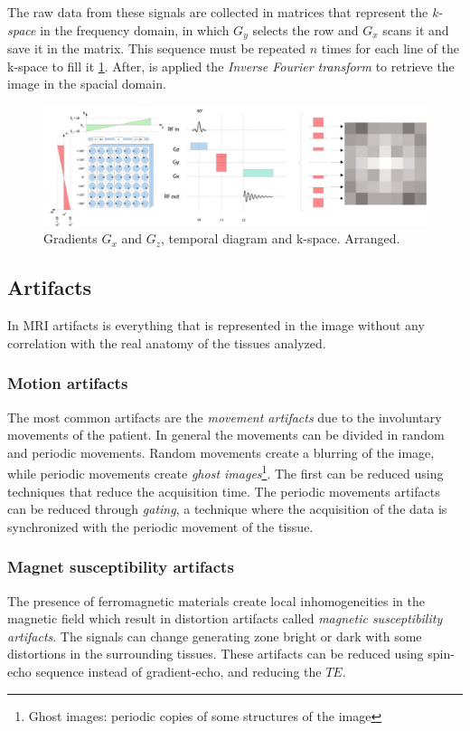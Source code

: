  The raw data from these signals are collected in matrices that represent the \emph{k-space} in the frequency domain, in which $G_y$ selects the row and $G_x$ scans it and save it in the matrix.
 This sequence must be repeated $n$ times for each line of the k-space to fill it \ref{fig:gradXY}.
 After, is applied the \emph{Inverse Fourier transform} to retrieve the image in the spacial domain.

 \begin{figure}[h]
    \centering
    \includegraphics[width=1\textwidth]{images/gradxy.png}
    \caption{Gradients $G_x$ and $G_z$, temporal diagram and k-space. \cite{elementiRisonanza} Arranged.}
    \label{fig:gradXY}
 \end{figure}

 \subsection{Artifacts}
 In MRI artifacts is everything that is represented in the image without any correlation with the real anatomy of the tissues analyzed.
  \subsubsection*{Motion artifacts}
  The most common artifacts are the \emph{movement artifacts} due to the involuntary movements of the patient. In general the movements can be divided in random and periodic movements. Random movements create a blurring of the image, while periodic movements create \emph{ghost images}\footnote{Ghost images: periodic copies of some structures of the image}. The first can be reduced using techniques that reduce the acquisition time. The periodic movements artifacts can be reduced through \emph{gating}, a technique where the acquisition of the data is synchronized with the periodic movement of the tissue. \cite{artifacts}
  \subsubsection*{Magnet susceptibility artifacts}
  The presence of ferromagnetic materials create local inhomogeneities in the magnetic field which result in distortion artifacts called \emph{magnetic susceptibility artifacts}. The signals can change generating zone bright or dark with some distortions in the surrounding tissues. These artifacts can be reduced using spin-echo sequence instead of gradient-echo, and reducing the $TE$. \cite{artifacts}
